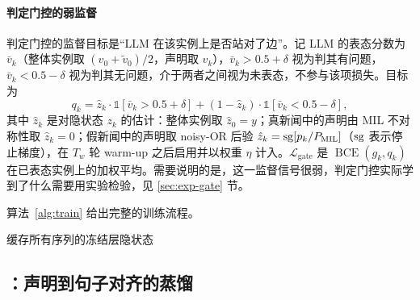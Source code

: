 \paragraph{判定门控的弱监督}
判定门控的监督目标是“LLM 在该实例上是否站对了边”。记 LLM 的表态分数为 $\bar v_k$（整体实例取 $(v_0+\tilde v_0)/2$，声明取 $v_k$），$\bar v_k>0.5+\delta$ 视为判其有问题，$\bar v_k<0.5-\delta$ 视为判其无问题，介于两者之间视为未表态，不参与该项损失。目标为
\begin{equation}
q_k=\hat z_k\cdot\mathbb{1}[\bar v_k>0.5+\delta]+(1-\hat z_k)\cdot\mathbb{1}[\bar v_k<0.5-\delta],
\end{equation}
其中 $\hat z_k$ 是对隐状态 $z_k$ 的估计：整体实例取 $\hat z_0=y$；真新闻中的声明由 MIL 不对称性取 $\hat z_k=0$；假新闻中的声明取 noisy-OR 后验 $\hat z_k=\operatorname{sg}[p_k/P_{\mathrm{MIL}}]$（$\operatorname{sg}$ 表示停止梯度），在 $T_w$ 轮 warm-up 之后启用并以权重 $\eta$ 计入。$\mathcal L_{\mathrm{gate}}$ 是 $\operatorname{BCE}(g_k,q_k)$ 在已表态实例上的加权平均。需要说明的是，这一监督信号很弱，判定门控实际学到了什么需要用实验检验，见 \ref{sec:exp-gate} 节。

算法~\ref{alg:train} 给出完整的训练流程。

\begin{algorithm}[t]
\caption{\method{} 的训练}\label{alg:train}
缓存所有序列的冻结层隐状态\;
\end{algorithm}

\subsection{\student{}：声明到句子对齐的蒸馏}\label{sec:student}

